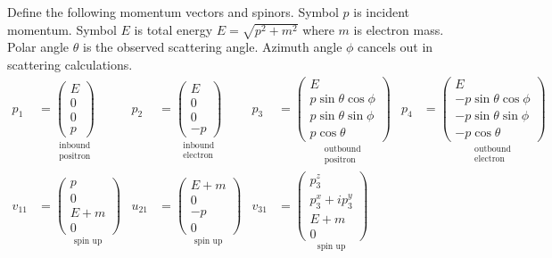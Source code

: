 \documentclass[12pt]{article}
\begin{document}
Define the following momentum vectors and spinors.
Symbol $p$ is incident momentum.
Symbol $E$ is total energy $E=\sqrt{p^2+m^2}$ where $m$ is electron mass.
Polar angle $\theta$ is the observed scattering angle.
Azimuth angle $\phi$ cancels out in scattering calculations.
\iffalse
\begin{align*}
p_1&=
\underset{\substack{\text{inbound}\\\text{positron}}}
{
\begin{pmatrix}E\\0\\0\\p\end{pmatrix}
}
&
p_2&=
\underset{\substack{\text{inbound}\\\text{electron}}}
{
\begin{pmatrix}E\\0\\0\\-p\end{pmatrix}
}
&
p_3&=
\underset{\substack{\text{outbound}\\\text{positron}}}
{
\begin{pmatrix}
E\\
p\sin\theta\cos\phi\\
p\sin\theta\sin\phi\\
p\cos\theta
\end{pmatrix}
}
&
p_4&=
\underset{\substack{\text{outbound}\\\text{electron}}}
{
\begin{pmatrix}
E\\
-p\sin\theta\cos\phi\\
-p\sin\theta\sin\phi\\
-p\cos\theta
\end{pmatrix}
}
\\[1ex]
v_{11}&=
\underset{\text{spin up}}
{
\begin{pmatrix}p\\0\\E+m\\0\end{pmatrix}
}
&
u_{21}&=
\underset{\text{spin up}}
{
\begin{pmatrix}E+m\\0\\-p\\0\end{pmatrix}
}
&
v_{31}&=
\underset{\text{spin up}}
{
\begin{pmatrix}p_3^z\\p_3^x+ip_3^y\\E+m\\0\end{pmatrix}
}
\end{align*}
\end{document}
